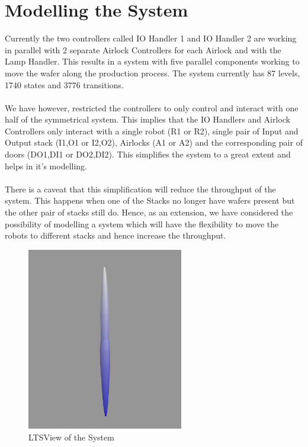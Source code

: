 \documentclass[a4paper,12pt]{article}
\begin{document}
\section{Modelling the System}
Currently the two controllers called IO Handler 1 and IO Handler 2 are working in parallel with 2 separate Airlock Controllers for each Airlock and with the Lamp Handler. This results in a system with five parallel components working to move the wafer along the production process. The system currently has 87 levels, 1740 states and 3776 transitions.
\\
\\We have however, restricted the controllers to only control and interact with one half of the symmetrical system. This implies that the IO Handlers and Airlock Controllers only interact with a single robot (R1 or R2), single pair of Input and Output stack (I1,O1 or I2,O2), Airlocks (A1 or A2) and the corresponding pair of doors (DO1,DI1 or DO2,DI2). This simplifies the system to a great extent and helps in it's modelling.
\\
\\There is a caveat that this simplification will reduce the throughput of the system. This happens when one of the Stacks no longer have wafers present but the other pair of stacks still do. Hence, as an extension, we have considered the possibility of modelling a system which will have the flexibility to move the robots to different stacks and hence increase the throughput. 
\begin{figure}[ht]
\centering
    \includegraphics[width=\textwidth, height=8cm]{3D-Model.png}
  \caption{LTSView of the System}
  \label{fig:ltsview}
\end{figure}
\newpage
\end{document}
